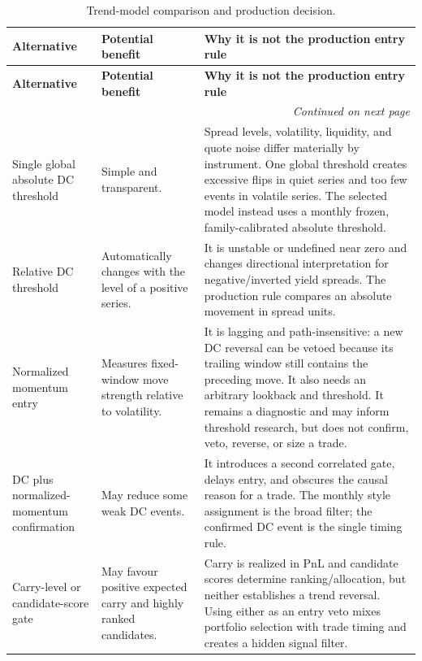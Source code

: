 {
\small
\setlength{\LTleft}{0pt}
\setlength{\LTright}{0pt}
\setlength{\tabcolsep}{5pt}
\renewcommand{\arraystretch}{1.15}
\begin{longtable}{p{} p{} p{}}
\caption{Trend-model comparison and production decision.}\label{tab:pairs-model-comparison-overleaf} \\
\toprule
\textbf{Alternative} & \textbf{Potential benefit} & \textbf{Why it is not the production entry rule} \\
\midrule
\endfirsthead
\toprule
\textbf{Alternative} & \textbf{Potential benefit} & \textbf{Why it is not the production entry rule} \\
\midrule
\endhead
\midrule
\multicolumn{3}{r}{\textit{Continued on next page}} \\
\midrule
\endfoot
\bottomrule
\endlastfoot
Single global absolute DC threshold & Simple and transparent. & Spread levels, volatility, liquidity, and quote noise differ materially by instrument. One global threshold creates excessive flips in quiet series and too few events in volatile series. The selected model instead uses a monthly frozen, family-calibrated absolute threshold. \\
Relative DC threshold & Automatically changes with the level of a positive series. & It is unstable or undefined near zero and changes directional interpretation for negative/inverted yield spreads. The production rule compares an absolute movement in spread units. \\
Normalized momentum entry & Measures fixed-window move strength relative to volatility. & It is lagging and path-insensitive: a new DC reversal can be vetoed because its trailing window still contains the preceding move. It also needs an arbitrary lookback and threshold. It remains a diagnostic and may inform threshold research, but does not confirm, veto, reverse, or size a trade. \\
DC plus normalized-momentum confirmation & May reduce some weak DC events. & It introduces a second correlated gate, delays entry, and obscures the causal reason for a trade. The monthly style assignment is the broad filter; the confirmed DC event is the single timing rule. \\
Carry-level or candidate-score gate & May favour positive expected carry and highly ranked candidates. & Carry is realized in PnL and candidate scores determine ranking/allocation, but neither establishes a trend reversal. Using either as an entry veto mixes portfolio selection with trade timing and creates a hidden signal filter. \\

\end{longtable}}
